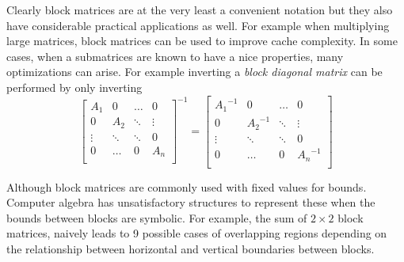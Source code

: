 Clearly block matrices are at the very least a convenient notation but they also have considerable practical applications as well.
For example when multiplying large matrices, block matrices can be used to improve cache complexity. \cite{lam1991cache}
In some cases, when a submatrices are known to have a nice properties, many optimizations can arise.
For example inverting a \emph{block diagonal matrix} can be performed by only inverting 
\begin{equation}
	\begin{bmatrix}
		A_1 & 0 & \ldots & 0 \\
		0 & A_2 & \ddots & \vdots \\
		\vdots & \ddots & \ddots & 0 \\
		0 & \ldots & 0 & A_n \\
	\end{bmatrix}^{-1}
	=
	\begin{bmatrix}
		{A_1}^{-1} & 0 & \ldots & 0 \\
		0 & {A_2}^{-1} & \ddots & \vdots \\
		\vdots & \ddots & \ddots & 0 \\
		0 & \ldots & 0 & {A_n}^{-1} \\
	\end{bmatrix}
\end{equation}

Although block matrices are commonly used with fixed values for bounds.
Computer algebra has unsatisfactory structures to represent these when the bounds between blocks are symbolic.
For example, the sum of $2 \times 2$ block matrices, naively leads to 9 possible cases of overlapping regions depending on
the relationship between horizontal and vertical boundaries between blocks.


